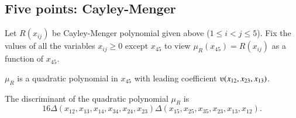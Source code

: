 \begin{tarskidata}
\begin{tarski}
\section{Five points: Cayley-Menger}
Let $R(x_{ij})$ be  Cayley-Menger polynomial given above
 ($1\le i < j\le 5$).  Fix the values of all the variables $x_{ij}\ge 0$ except
$x_{45}$ to view $\mu_R(x_{45})=R(x_{ij})$ as a function of $x_{45}$.

\begin{lemma}
$\mu_R$  is a quadratic
polynomial in $x_{45}$ with leading coefficient 
$\ups(x_{12},x_{23},x_{13})$. 
\end{lemma}

\begin{proved}
\swallowed\end{proved}
\end{tarski}





\begin{tarski}

\begin{lemma}
The discriminant of the quadratic polynomial $\mu_R$ is
	$$
	16\Delta(x_{12}, x_{13}, x_{14}, x_{34}, x_{24}, x_{23}) 
	\Delta(x_{15}, x_{25}, x_{35}, x_{23}, 
          x_{13}, x_{12}).
	$$
\end{lemma}

\begin{proved}
\swallowed\end{proved}
\end{tarski}




\begin{tarski}


\end{tarski}
\end{tarskidata}
